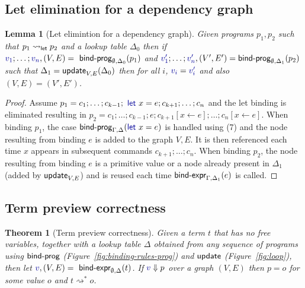 \documentclass[english,crc]{programming}
\newcounter{thc}
\theoremstyle{plain}
\newtheorem{lem}[thc]{Lemma}
\newtheorem{theorem}[thc]{Theorem}
\theoremstyle{definition}
\newcommand{\ident}[1]{\textnormal{\textcolor{idclr}{\sffamily #1}}}
\newcommand{\kvd}[1]{\textnormal{\textcolor{kvdclr}{\sffamily #1}}}
\newcommand{\bndclr}[1]{\textcolor{kvdclr}{#1}}
\begin{document}
\subsection{Let elimination for a dependency graph}
\label{sec:app-let-grp-elimination}

\begin{lem}[Let elimintion for a dependency graph]
\label{thm:app-let-grp-elimination}
Given programs $p_1, p_2$ such that $p_1 \rightsquigarrow_\ident{let} p_2$ and a lookup table
$\Delta_0$ then if $\bndclr{v_1}; \ldots; \bndclr{v_n}, (V, E) = \ident{bind-prog}_{\emptyset, \Delta_0}(p_1)$ and
$\bndclr{v'_1};\ldots;\bndclr{v'_n}, (V', E') = \ident{bind-prog}_{\emptyset, \Delta_1}(p_2)$ such that $\Delta_1 = \ident{update}_{V, E}(\Delta_0)$
then for all $i$, $\bndclr{v_i} = \bndclr{v'_i}$ and also $(V, E) = (V', E')$.
\end{lem}
\begin{proof}
Assume $p_1 = c_1; \ldots; c_{k-1}; \kvd{let}~x=e; c_{k+1};\ldots; c_n$ and the let binding is
eliminated resulting in $p_2 = c_1; \ldots; c_{k-1}; e; c_{k+1}[x\leftarrow e];\ldots; c_n[x\leftarrow e]$.
When binding $p_1$, the case $\ident{bind-prog}_{\Gamma,\Delta}(\kvd{let}~x=e)$ is handled using (7)
and the node resulting from binding $e$ is added to the graph $V, E$. It is then referenced each
time $x$ appears in subsequent commands $c_{k+1}; \ldots; c_n$.
When binding $p_2$, the node resulting from binding $e$ is a primitive value or a node already
present in $\Delta_1$ (added by $\ident{update}_{V, E}$) and is reused each time
$\ident{bind-expr}_{\Gamma,\Delta_1}(e)$ is called.
\end{proof}


\subsection{Term preview correctness}
\label{sec:app-correctness}

\begin{theorem}[Term preview correctness]
Given a term $t$ that has no free variables, together with a lookup table $\Delta$ obtained
from any sequence of programs using $\ident{bind-prog}$ (Figure~\ref{fig:binding-rules-prog}) and
$\ident{update}$ (Figure~\ref{fig:loop}), then
let $\bndclr{v}, (V, E) = \ident{bind-expr}_{\emptyset, \Delta}(t)$. If $\bndclr{v}\Downarrow p$
over a graph $(V, E)$ then $p = o$ for some value $o$ and $t \rightsquigarrow^{*} o$.
\end{theorem}
\end{document}
